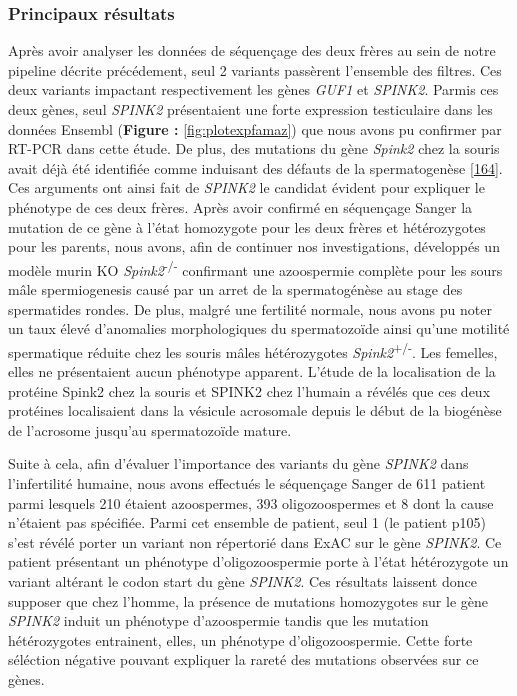 \documentclass[12pt,twoside]{reedthesis}
\theoremstyle{definition}
\theoremstyle{definition}
\theoremstyle{remark}
\begin{document}
  \newpage
  
  
  
  \newpage
  
  \subsubsection{Principaux résultats}\label{principaux-resultats}
  
  Après avoir analyser les données de séquençage des deux frères au sein
  de notre pipeline décrite précédement, seul 2 variants passèrent
  l'ensemble des filtres. Ces deux variants impactant respectivement les
  gènes \emph{GUF1} et \emph{SPINK2}. Parmis ces deux gènes, seul
  \emph{SPINK2} présentaient une forte expression testiculaire dans les
  données Ensembl (\textbf{Figure : }\ref{fig:plotexpfamaz}) que nous
  avons pu confirmer par RT-PCR dans cette étude. De plus, des mutations
  du gène \emph{Spink2} chez la souris avait déjà été identifiée comme
  induisant des défauts de la spermatogenèse
  {[}\protect\hyperlink{ref-Lee2011}{164}{]}. Ces arguments ont ainsi fait
  de \emph{SPINK2} le candidat évident pour expliquer le phénotype de ces
  deux frères. Après avoir confirmé en séquençage Sanger la mutation de ce
  gène à l'état homozygote pour les deux frères et hétérozygotes pour les
  parents, nous avons, afin de continuer nos investigations, développés un
  modèle murin KO \emph{Spink2}\textsuperscript{-/-} confirmant une
  azoospermie complète pour les sours mâle spermiogenesis causé par un
  arret de la spermatogénèse au stage des spermatides rondes. De plus,
  malgré une fertilité normale, nous avons pu noter un taux élevé
  d'anomalies morphologiques du spermatozoïde ainsi qu'une motilité
  spermatique réduite chez les souris mâles hétérozygotes
  \emph{Spink2}\textsuperscript{+/-}. Les femelles, elles ne présentaient
  aucun phénotype apparent. L'étude de la localisation de la protéine
  Spink2 chez la souris et SPINK2 chez l'humain a révélés que ces deux
  protéines localisaient dans la vésicule acrosomale depuis le début de la
  biogénèse de l'acrosome jusqu'au spermatozoïde mature.
  
  Suite à cela, afin d'évaluer l'importance des variants du gène
  \emph{SPINK2} dans l'infertilité humaine, nous avons effectués le
  séquençage Sanger de 611 patient parmi lesquels 210 étaient azoospermes,
  393 oligozoospermes et 8 dont la cause n'étaient pas spécifiée. Parmi
  cet ensemble de patient, seul 1 (le patient p105) s'est révélé porter un
  variant non répertorié dans ExAC sur le gène \emph{SPINK2}. Ce patient
  présentant un phénotype d'oligozoospermie porte à l'état hétérozygote un
  variant altérant le codon start du gène \emph{SPINK2}. Ces résultats
  laissent donce supposer que chez l'homme, la présence de mutations
  homozygotes sur le gène \emph{SPINK2} induit un phénotype d'azoospermie
  tandis que les mutation hétérozygotes entrainent, elles, un phénotype
  d'oligozoospermie. Cette forte séléction négative pouvant expliquer la
  rareté des mutations observées sur ce gènes.
  
\end{document}
